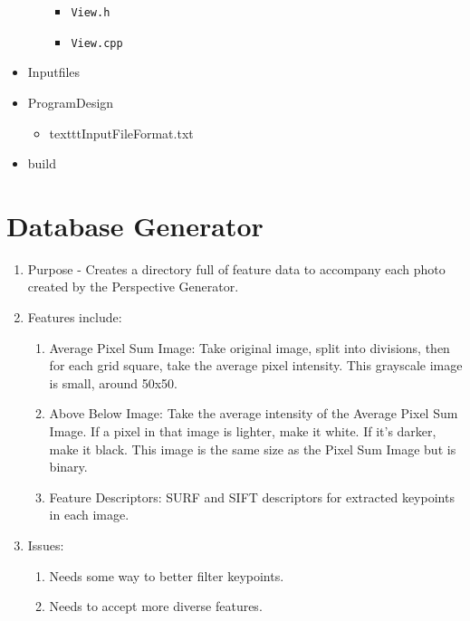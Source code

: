 \documentclass[a4paper,11pt]{article}
\begin{document}
\begin{itemize}
\begin{itemize}
\begin{itemize}
                    \item \texttt{View.h}
                    \item \texttt{View.cpp}
                \end{itemize}
            \end{itemize}%
        \item Inputfiles
        \item ProgramDesign
            \begin{itemize}
                \item texttt{InputFileFormat.txt}
            \end{itemize}
        \item build
        \end{itemize} %

        



\section{Database Generator}
\begin{enumerate}
    \item Purpose - Creates a directory full of feature data to accompany each photo created by the Perspective Generator. 
    \item Features include:
    \begin{enumerate}
        \item Average Pixel Sum Image: Take original image, split into divisions, then for each grid square, take the average pixel intensity. This grayscale image is small, around 50x50.
        \item Above Below Image: Take the average intensity of the Average Pixel Sum Image. If a pixel in that image is lighter, make it white. If it's darker, make it black. This image is the same size as the Pixel Sum Image but is binary.
        \item Feature Descriptors: SURF and SIFT descriptors for extracted keypoints in each image.
    \end{enumerate}
    \item Issues:
    \begin{enumerate}
        \item Needs some way to better filter keypoints.
        \item Needs to accept more diverse features.
    \end{enumerate}
\end{enumerate}

  

  
\end{document}
